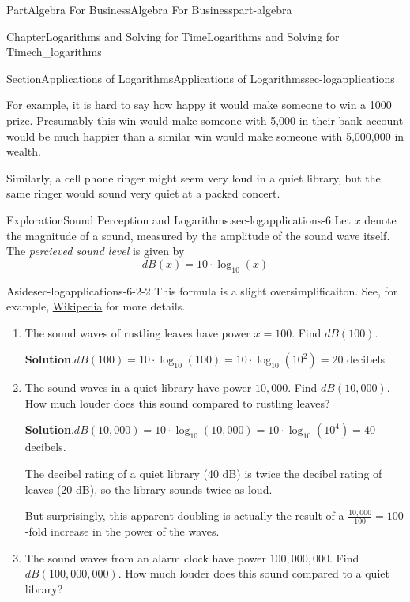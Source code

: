 \documentclass[oneside,10pt,]{tufte-book}
\newcommand{\blocktitlefont}{\relax}
\numberwithin{equation}{chapter}
\begin{document}
\begin{partptx}{Part}{Algebra For Business}{}{Algebra For Business}{}{}{part-algebra}
\begin{chapterptx}{Chapter}{Logarithms and Solving for Time}{}{Logarithms and Solving for Time}{}{}{ch_logarithms}
\begin{sectionptx}{Section}{Applications of Logarithms}{}{Applications of Logarithms}{}{}{sec-logapplications}
\par
For example, it is hard to say how happy it would make someone to win a \textdollar{}1000 prize. Presumably this win would make someone with \textdollar{}5,000 in their bank account would be much happier than a similar win would make someone with \textdollar{}5,000,000 in wealth.%
\par
Similarly, a cell phone ringer might seem very loud in a quiet library, but the same ringer would sound very quiet at a packed concert.%
\begin{exploration}{Exploration}{Sound Perception and Logarithms.}{sec-logapplications-6}%
Let \(x\) denote the magnitude of a sound, measured by the amplitude of the sound wave itself. The \emph{percieved sound level} is given by%
\begin{equation*}
dB(x) = 10\cdot \log_{10}(x)
\end{equation*}
%
\begin{aside}{Aside}{}{sec-logapplications-6-2-2}%
This formula is a slight oversimplificaiton.  See, for example, \href{https://en.wikipedia.org/wiki/Decibel\#Perception}{Wikipedia}\footnotemark{} for more details.%
\end{aside}
\begin{enumerate}[font=\bfseries,label=(\alph*),ref=\alph*]%
\item{}The sound waves of rustling leaves have power \(x=100\). Find \(dB(100)\).%
\par\smallskip%
\noindent\textbf{\blocktitlefont Solution}.\hypertarget{sec-logapplications-6-3-2}{}\quad{}\(dB(100)=10\cdot\log_{10}(100) = 10\cdot\log_{10}(10^2)  = 20\) decibels%
\item{}The sound waves in a quiet library have power \(10,000\). Find \(dB(10,000)\). How much louder does this sound compared to rustling leaves?%
\par\smallskip%
\noindent\textbf{\blocktitlefont Solution}.\hypertarget{sec-logapplications-6-4-2}{}\quad{}\(dB(10,000)=10\cdot\log_{10}(10,000) = 10\cdot\log_{10}(10^4) = 40\) decibels.%
\par
The decibel rating of a quiet library (40 dB) is twice the decibel rating of leaves (20 dB), so the library sounds twice as loud.%
\par
But surprisingly, this apparent doubling is actually the result of a \(\frac{10,000}{100}=100\)-fold increase in the power of the waves.%
\item{}The sound waves from an alarm clock have power \(100,000,000\). Find \(dB(100,000,000)\). How much louder does this sound compared to a quiet library?%

\end{enumerate}
\end{exploration}
\end{sectionptx}
\end{chapterptx}
\end{partptx}
\end{document}
